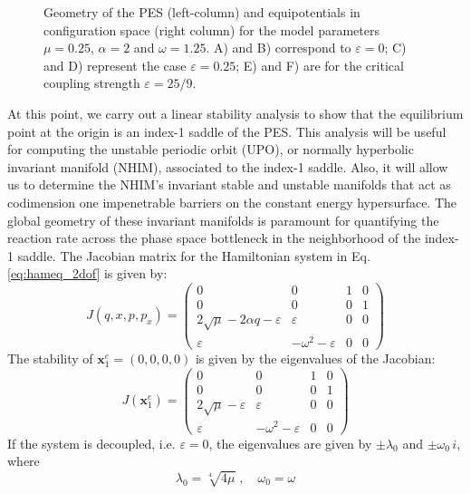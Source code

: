 \documentclass[8pt]{article}
\begin{document}
\begin{figure}[htbp]
	\caption{Geometry of the PES (left-column) and equipotentials in configuration space  (right column) for the model parameters $\mu = 0.25$, $\alpha = 2$ and $\omega = 1.25$. A) and B) correspond to $\varepsilon = 0$; C) and D) represent the case $\varepsilon = 0.25$; E) and F) are for the critical coupling strength $\varepsilon = 25/9$.}
	\label{fig:figpes_2dof}
\end{figure} 

At this point, we carry out a linear stability analysis to show that the equilibrium point at the origin is an index-1 saddle of the PES. This analysis will be useful for computing the unstable periodic orbit (UPO), or normally hyperbolic invariant manifold (NHIM), associated to the index-1 saddle. Also, it will allow us to determine the NHIM's invariant stable and unstable manifolds that act as codimension one impenetrable barriers on the constant energy hypersurface. The global geometry of these invariant manifolds is paramount for quantifying the reaction rate across the phase space bottleneck in the neighborhood of the index-1 saddle. The Jacobian matrix for the Hamiltonian system in Eq. \eqref{eq:hameq_2dof} is given by:
\begin{equation}
J(q,x,p,p_x) = 
\begin{pmatrix}
0 & 0 & 1 & 0 \\[.1cm]
0 & 0 & 0 & 1 \\[.1cm]
2\sqrt{\mu} - 2\alpha q - \varepsilon & \varepsilon & 0 & 0 \\[.1cm]
\varepsilon & -\omega^2 - \varepsilon & 0 & 0
\end{pmatrix}
\end{equation}
The stability of $\mathbf{x}_1^e = (0,0,0,0) $ is given by the eigenvalues of the Jacobian:
\begin{equation}
J(\mathbf{x}_1^e) = 
\begin{pmatrix}
0 & 0 & 1 & 0 \\[.1cm]
0 & 0 & 0 & 1 \\[.1cm]
2\sqrt{\mu} - \varepsilon & \varepsilon & 0 & 0 \\[.1cm]
\varepsilon & -\omega^2 - \varepsilon & 0 & 0
\end{pmatrix}
\label{eq:jacobian_2dof}
\end{equation}
If the system is decoupled, i.e. $\varepsilon = 0$, the eigenvalues are given by $\pm \lambda_0$ and $\pm \omega_0 \, i$, where 
\begin{equation}
\lambda_0 = \sqrt[4]{4\mu} \;,\quad \omega_0 = \omega
\end{equation}
\end{document}
